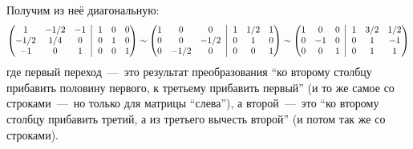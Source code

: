 \documentclass[a4paper,12pt]{article}
\newcommand{\BigMiddleThree}{\;\left|\vphantom{\begin{pmatrix} 0\\0\\0 \end{pmatrix}}\right.\;}
\begin{document}
\begin{solution}
    Получим из неё диагональную:
    \begin{equation}
    \begin{split}
      \left(
        \begin{matrix}
          1    & -1/2 & -1\\
          -1/2 & 1/4  & 0\\
          -1   & 0    & 1
        \end{matrix}
        \BigMiddleThree
        \begin{matrix}
          1 & 0 & 0\\
          0 & 1 & 0\\
          0 & 0 & 1
        \end{matrix}
      \right)
      \sim \left(
        \begin{matrix}
          1 & 0    & 0\\
          0 & 0    & -1/2\\
          0 & -1/2 & 0
        \end{matrix}
        \BigMiddleThree
        \begin{matrix}
          1 & 1/2 & 1\\
          0 & 1   & 0\\
          0 & 0   & 1
        \end{matrix}
      \right)
      \sim \left(
        \begin{matrix}
          1 & 0  & 0\\
          0 & -1 & 0\\
          0 & 0  & 1
        \end{matrix}
        \BigMiddleThree
        \begin{matrix}
          1 & 3/2 & 1/2\\
          0 & 1   & -1\\
          0 & 1   & 1
        \end{matrix}
      \right)
    \end{split}
    \end{equation}
    где первый переход~---~это результат преобразования ``ко второму столбцу прибавить половину первого, к третьему прибавить первый'' (и то же самое со строками~---~но только для матрицы ``слева''), а второй~---~это ``ко второму столбцу прибавить третий, а из третьего вычесть второй'' (и потом так же со строками).
    

\end{solution}
\end{document}
